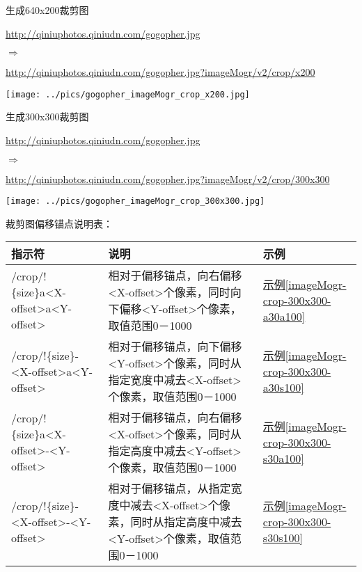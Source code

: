 \documentclass[11pt, oneside]{book}
\newcommand{\qpar}[1]{
\vspace{0.25em}
\noindent
#1\par
\vspace{0.25em}
}
\newcommand{\qurl}[1]{\url{#1}}
\newcommand{\qtable}[1]{\footnotesize\vspace{0.5em}#1\vspace{0.5em}\normalsize}
\begin{document}
\begin{CJK*}{UTF8}{song}
\begin{sample}
  \caption{生成640x200裁剪图}
    \qpar{\qurl{http://qiniuphotos.qiniudn.com/gogopher.jpg}}
    \qpar{$\Rightarrow$}
    \qpar{\qurl{http://qiniuphotos.qiniudn.com/gogopher.jpg?imageMogr/v2/crop/x200}}

    \begin{center}
      \texttt{[image: ../pics/gogopher\_imageMogr\_crop\_x200.jpg]}
    \end{center}
  \label{imageMogr-crop-x200}
\end{sample}

\begin{sample}
  \caption{生成300x300裁剪图}
    \qpar{\qurl{http://qiniuphotos.qiniudn.com/gogopher.jpg}}
    \qpar{$\Rightarrow$}
    \qpar{\qurl{http://qiniuphotos.qiniudn.com/gogopher.jpg?imageMogr/v2/crop/300x300}}

    \begin{center}
      \texttt{[image: ../pics/gogopher\_imageMogr\_crop\_300x300.jpg]}
    \end{center}
  \label{imageMogr-crop-300x300}
\end{sample}

\qpar{裁剪图偏移锚点说明表：}
\qtable{
\label{offset-anchor-spec}
\begin{tabular}[t]{|l|p{18em}|p{4em}|}
\hline
指示符 & 说明 & 示例 \\
\hline
/crop/!\{size\}a\textless X-offset\textgreater a\textless Y-offset\textgreater & 相对于偏移锚点，向右偏移\textless X-offset\textgreater 个像素，同时向下偏移\textless Y-offset\textgreater 个像素，取值范围0－1000 & \hyperref[imageMogr-crop-300x300-a30a100]{示例\ref*{imageMogr-crop-300x300-a30a100}} \\
\hline
/crop/!\{size\}-\textless X-offset\textgreater a\textless Y-offset\textgreater & 相对于偏移锚点，向下偏移\textless Y-offset\textgreater 个像素，同时从指定宽度中减去\textless X-offset\textgreater 个像素，取值范围0－1000 & \hyperref[imageMogr-crop-300x300-a30s100]{示例\ref*{imageMogr-crop-300x300-a30s100}} \\
\hline
/crop/!\{size\}a\textless X-offset\textgreater -\textless Y-offset\textgreater & 相对于偏移锚点，向右偏移\textless X-offset\textgreater 个像素，同时从指定高度中减去\textless Y-offset\textgreater 个像素，取值范围0－1000 & \hyperref[imageMogr-crop-300x300-s30a100]{示例\ref*{imageMogr-crop-300x300-s30a100}} \\
\hline
/crop/!\{size\}-\textless X-offset\textgreater -\textless Y-offset\textgreater & 相对于偏移锚点，从指定宽度中减去\textless X-offset\textgreater 个像素，同时从指定高度中减去\textless Y-offset\textgreater 个像素，取值范围0－1000 & \hyperref[imageMogr-crop-300x300-s30s100]{示例\ref*{imageMogr-crop-300x300-s30s100}} \\
\hline
\end{tabular}
}


\end{CJK*}
\end{document}
